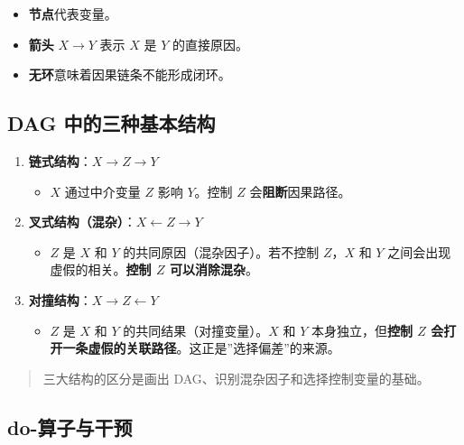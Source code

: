 \documentclass[
]{book}
\providecommand{\tightlist}{%
  \setlength{\itemsep}{0pt}\setlength{\parskip}{0pt}}
\begin{document}
\begin{itemize}
\tightlist
\item
  \textbf{节点}代表变量。
\item
  \textbf{箭头} \(X \rightarrow Y\) 表示 \(X\) 是 \(Y\) 的直接原因。
\item
  \textbf{无环}意味着因果链条不能形成闭环。
\end{itemize}

\subsection{DAG 中的三种基本结构}\label{dag-ux4e2dux7684ux4e09ux79cdux57faux672cux7ed3ux6784}

\begin{enumerate}
\def\labelenumi{\arabic{enumi}.}
\tightlist
\item
  \textbf{链式结构}：\(X \rightarrow Z \rightarrow Y\)

  \begin{itemize}
  \tightlist
  \item
    \(X\) 通过中介变量 \(Z\) 影响 \(Y\)。控制 \(Z\) 会\textbf{阻断}因果路径。
  \end{itemize}
\item
  \textbf{叉式结构（混杂）}：\(X \leftarrow Z \rightarrow Y\)

  \begin{itemize}
  \tightlist
  \item
    \(Z\) 是 \(X\) 和 \(Y\) 的共同原因（混杂因子）。若不控制 \(Z\)，\(X\) 和 \(Y\) 之间会出现虚假的相关。\textbf{控制 \(Z\) 可以消除混杂}。
  \end{itemize}
\item
  \textbf{对撞结构}：\(X \rightarrow Z \leftarrow Y\)

  \begin{itemize}
  \tightlist
  \item
    \(Z\) 是 \(X\) 和 \(Y\) 的共同结果（对撞变量）。\(X\) 和 \(Y\) 本身独立，但\textbf{控制 \(Z\) 会打开一条虚假的关联路径}。这正是''选择偏差''的来源。
  \end{itemize}
\end{enumerate}

\begin{quote}
三大结构的区分是画出 DAG、识别混杂因子和选择控制变量的基础。
\end{quote}

\subsection{do-算子与干预}\label{do-ux7b97ux5b50ux4e0eux5e72ux9884}
\end{document}
